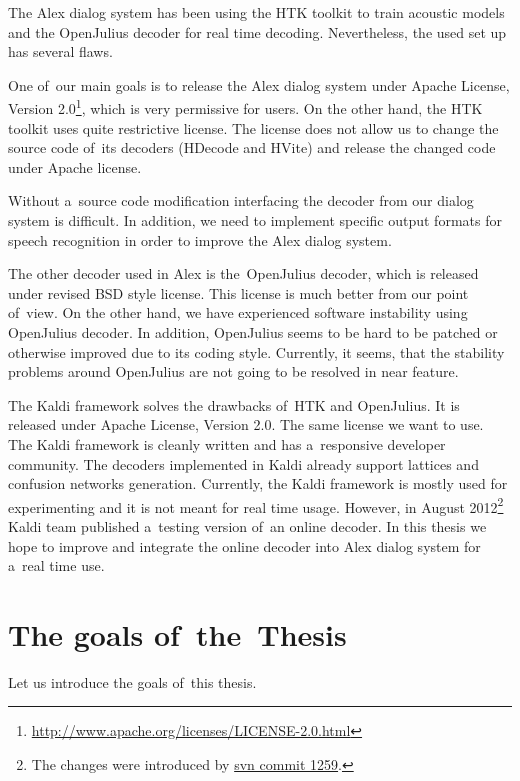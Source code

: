 The Alex dialog system has been using the HTK toolkit\cite{young94htk} to train acoustic models and the OpenJulius\cite{lee2009julius} decoder for real time decoding. Nevertheless, the used set up has several flaws.

One of~our main goals is to release the Alex dialog system under Apache License, Version 2.0\footnote{\url{http://www.apache.org/licenses/LICENSE-2.0.html}}, which is very permissive for users. On the other hand, the HTK toolkit uses quite restrictive license. The license does not allow us to change the source code of~its decoders (HDecode and HVite) and release the changed code under Apache license. 

Without a~source code modification interfacing the decoder from our dialog system is difficult. In addition, we need to implement specific output formats for speech recognition in order to improve the Alex dialog system.

The other decoder used in Alex is the~OpenJulius decoder, which is released under revised BSD style license. This license is much better from our point of~view. On the other hand, we have experienced software instability using OpenJulius decoder. In addition, OpenJulius seems to be hard to be patched or otherwise improved due to its coding style. Currently, it seems, that the stability problems around OpenJulius are not going to be resolved in near feature.

The Kaldi\cite{povey2011kaldi} framework solves the drawbacks of~HTK and OpenJulius. It is released under Apache License, Version 2.0. The same license we want to use. The Kaldi framework is cleanly written and has a~responsive developer community. The decoders implemented in Kaldi already support lattices and confusion networks generation. Currently, the Kaldi framework is mostly used for experimenting and it is not meant for real time usage. However, in August 2012\footnote{The changes were introduced by \href{https://sourceforge.net/p/kaldi/code/1259/}{svn commit 1259}.} Kaldi team published a~testing version of~an online decoder. In this thesis we hope to improve and integrate the online decoder into Alex dialog system for a~real time use.


\section{The goals of~the~Thesis} 
\label{sec:goals}
Let us introduce the goals of~this thesis.

